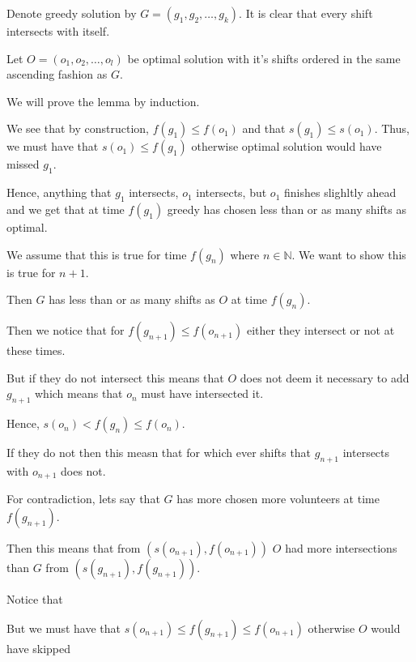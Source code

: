 \begin{soln}
	Denote greedy solution by \(G = (g_1, g_2, \dots, g_k)\). It is clear that every shift intersects with itself.

	Let \(O = (o_1, o_2, \dots, o_l)\) be optimal solution with it's shifts ordered in the same ascending fashion as \(G\).

	We will prove the lemma by induction.

	We see that by construction, \(f(g_1) \leq f(o_1)\) and that \(s(g_1) \leq s(o_1)\). Thus, we must have that \(s(o_1) \leq f(g_1)\) otherwise optimal solution would have missed \(g_1\).

	Hence, anything that \(g_1\) intersects, \(o_1\) intersects, but \(o_1\) finishes slighltly ahead and we get that at time \(f(g_1)\)
	greedy has chosen less than or as many shifts as optimal.

	We assume that this is true for time \(f(g_n)\) where \(n \in \mathbb{N}\). We want to show this is true for \(n + 1\).

	Then \(G\) has less than or as many shifts as \(O\) at time \(f(g_n)\).

	Then we notice that for \(f(g_{n + 1}) \leq f(o_{n + 1})\) either they intersect or not at these times.

	But if they do not intersect this means that \(O\) does not deem it necessary to add \(g_{n+1}\) which means that \(o_{n}\) must have intersected it.

	Hence, \(s(o_n) < f(g_n) \leq f(o_n)\).

	If they do not then this measn that for which ever shifts that \(g_{n+1}\) intersects with \(o_{n+1}\) does not.

	For contradiction, lets say that \(G\) has more chosen more volunteers at time \(f(g_{n+1})\).

	Then this means that from \((s(o_{n+1}), f(o_{n+1}))\) \(O\) had more intersections than \(G\) from \((s(g_{n+1}), f(g_{n+1}))\).

	Notice that \(\)

	But we must have that \(s(o_{n+1}) \leq f(g_{n+1}) \leq f(o_{n+1})\) otherwise \(O\) would have skipped


\end{soln}
